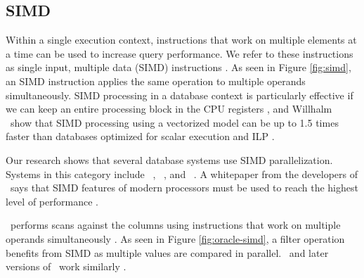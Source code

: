 \subsection{SIMD}
\label{sub:SIMD}
Within a single execution context, instructions that work on multiple elements at a time can be used to increase query performance. We refer to these instructions as single input, multiple data (SIMD) instructions \cite{Wikipedia_contributors2015-ax}. As seen in Figure \ref{fig:simd}, an SIMD instruction applies the same operation to multiple operands simultaneously. SIMD processing in a database context is particularly effective if we can keep an entire processing block in the CPU registers \cite{Neumann2011-uq}, and Willhalm \ea~show that SIMD processing using a vectorized model can be up to 1.5 times faster than databases optimized for scalar execution and ILP \cite{Willhalm2009-hu}.

Our research shows that several database systems use SIMD parallelization. Systems in this category include \oracle~\cite{Lahiri2015-mz}, \blink~\cite{Barber2012-xt}, and \ibm~\cite{Raman2013-em}. A whitepaper from the developers of \exasol~says that SIMD features of modern processors must be used to reach the highest level of performance \cite{Exasol2014-xh}.

\oracle~performs scans against the columns using instructions that work on multiple operands simultaneously \cite{Lahiri2015-mz}. As seen in Figure \ref{fig:oracle-simd}, a filter operation benefits from SIMD as multiple values are compared in parallel. \ibm~and later versions of \blink~work similarly \cite{Barber2012-xt, Raman2013-em}.

